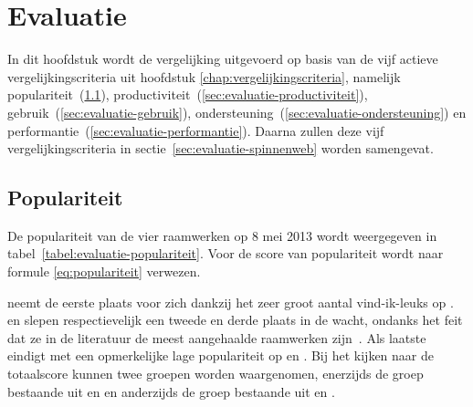 \chapter{Evaluatie}
\label{chap:evaluatie}

In dit hoofdstuk wordt de vergelijking uitgevoerd op basis van de vijf actieve vergelijkingscriteria uit hoofdstuk \ref{chap:vergelijkingscriteria}, namelijk populariteit~(\ref{sec:evaluatie-populariteit}), productiviteit~(\ref{sec:evaluatie-productiviteit}), gebruik~(\ref{sec:evaluatie-gebruik}), ondersteuning~(\ref{sec:evaluatie-ondersteuning}) en performantie~(\ref{sec:evaluatie-performantie}). 
Daarna zullen deze vijf vergelijkingscriteria in sectie~\ref{sec:evaluatie-spinnenweb} worden samengevat.


\section{Populariteit} %
\label{sec:evaluatie-populariteit}

De populariteit van de vier raamwerken op 8 mei 2013 wordt weergegeven in tabel~\ref{tabel:evaluatie-populariteit}. 
Voor de score van populariteit wordt naar formule \ref{eq:populariteit} verwezen.

\begin{table}
\centering
{}
\caption{Overzicht van populariteit op 8 mei 2013.}
\label{tabel:evaluatie-populariteit}
\end{table}

\kendo{} neemt de eerste plaats voor zich dankzij het zeer groot aantal vind-ik-leuks op \fb.
\jqm{} en \st{} slepen respectievelijk een tweede en derde plaats in de wacht, ondanks het feit dat ze in de literatuur de meest aangehaalde raamwerken zijn~\cite{David2011,Firtman2013,Hales2012,Oeflman2011}. 
Als laatste eindigt \lungo{} met een opmerkelijke lage populariteit op \so{} en \fb.
Bij het kijken naar de totaalscore kunnen twee groepen worden waargenomen, enerzijds de groep bestaande uit \kendo{} en \jqm{} en anderzijds de groep bestaande uit \st{} en \lungo{}.

